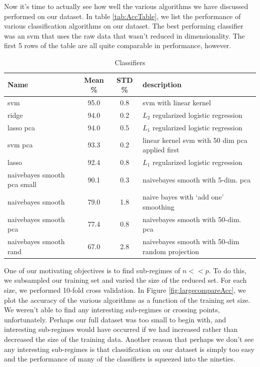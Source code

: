 
%

Now it's time to actually see how well the various algorithms we have discussed performed on our dataset. In table \ref{tab:AccTable}, we list the performance of various classification algorithms on our dataset. The best performing classifier was an svm that uses the raw data that wasn't reduced in dimensionality. The first 5 rows of the table are all quite comparable in performance, however. 


\begin{center}
\begin{table}
\begin{tabular}{lccl}
\hline
Name & Mean \% & STD \% & description\\
\hline
svm & 95.0 & 0.8 & svm with linear kernel\\
ridge & 94.0 & 0.2 & $L_2$ regularized logistic regression\\
lasso pca &  94.0 & 0.5 & $L_1$ regularized logistic regression\\
svm pca & 93.3 & 0.2 &  linear kernel svm with 50 dim pca applied first\\
lasso & 92.4 & 0.8 & $L_1$ regularized logistic regression\\
naivebayes smooth pca small & 90.1 & 0.3  & naivebayes smooth with 5-dim. pca\\
naivebayes smooth  & 79.0 & 1.8& naive bayes with `add one' smoothing\\
naivebayes smooth pca  & 77.4 & 0.8 & naivebayes smooth with 50-dim. pca\\
naivebayes smooth rand & 67.0 & 2.8 & naivebayes smooth with 50-dim random projection\\
\end{tabular}
\caption{Classifiers}
\label{tab:Classifiers}
\par
\end{table}
\end{center}


One of our motivating objectives is to find sub-regimes of $n << p$. To do this, we subsampled our training set and varied the size of the reduced set. For each size, we performed 10-fold cross validation. In Figure \ref{fig:largecompareAcc}, we plot the accuracy of the various algorithms as a function of the training set size. We weren't able to find any interesting sub-regimes or crossing points, unfortunately. Perhaps our full dataset was too small to begin with, and interesting sub-regimes would have occurred if we had increased rather than decreased the size of the training data. Another reason that perhaps we don't see any interesting sub-regimes is that classification on our dataset is simply too easy and the performance of many of the classifiers is squeezed into the nineties. 

